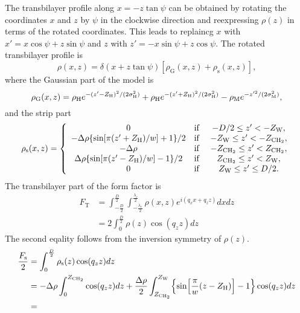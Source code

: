 \documentclass[12pt,letterpaper]{article}
\newcommand{\zw}{Z_\mathrm{W}}
\newcommand{\zchtwo}{Z_\mathrm{CH_2}}
\newcommand{\zh}{Z_\mathrm{H}}
\newcommand{\sigmah}{\sigma_\mathrm{H}}
\newcommand{\sigmam}{\sigma_\mathrm{M}}
\newcommand{\rhoh}{\rho_\mathrm{H}}
\newcommand{\rhom}{\rho_\mathrm{M}}
\newcommand{\rhog}{\rho_\mathrm{G}}
\newcommand{\rhos}{\rho_\mathrm{s}}
\begin{document}
The transbilayer profile along $x=-z\tan\psi$ can be obtained by rotating
the coordinates $x$ and $z$ by $\psi$ in the clockwise direction and
reexpressing $\rho(z)$ in terms of the rotated coordinates. This leads
to replaincg $x$ with $x'=x\cos\psi+z\sin\psi$ and
$z$ with $z'=-x\sin\psi+z\cos\psi$. The rotated transbilayer profile is
\begin{equation}
  \rho(x,z) = \delta(x+z\tan\psi)\left[\rhog(x,z) + \rhos(x,z)\right],
\end{equation}
where the Gaussian part of the model is 
\begin{equation}
  \rhog(x,z) = \rhoh e^{-(z'-\zh)^2/(2\sigmah^2)} \\
  + \rhoh e^{-(z'+\zh)^2/(2\sigmah^2)}
  - \rhom e^{-z'^2/(2\sigmam^2)},
\end{equation}
and the strip part
\begin{equation}
  \rhos(x,z) =  \left\{
    \begin{array}{ccc}
      0 & \text{if } & -D/2 \leq z' < -\zw,\\
      -\Delta\rho\braces{\sin\bracks{\pi(z'+\zh)/w}+1}/2 
        & \text{if } & -\zw \leq z' < -\zchtwo,\\
      -\Delta\rho & \text{if } & -\zchtwo \leq z' < \zchtwo,\\
      \Delta\rho\braces{\sin\bracks{\pi(z'-\zh)/w}-1}/2 
        & \text{if } & \zchtwo \leq z' < \zw,\\
      0 & \text{if } & \zw \leq z' \leq D/2.
    \end{array}
  \right.
\end{equation}
The transbilayer part of the form factor is
\begin{align}
  F_\mathrm{T} 
  &= \int_{-\frac{D}{2}}^{\frac{D}{2}} \int_{-\frac{\lambda_r}{2}}^{\frac{\lambda_r}{2}} 
     \rho(x,z) e^{i(q_xx+q_zz)} dxdz \nonumber\\
  &= 2 \int_0^{\frac{D}{2}} \rho(z) \cos (q_zz) dz
\end{align}
The second eqality follows from the inversion symmetry of $\rho(z)$. 
\begin{align}
  \frac{F_\mathrm{s}}{2} 
  &= \int_0^{\frac{D}{2}} \rho_\mathrm{s}(z) \cos (q_zz) dz \nonumber\\
  &= -\Delta\rho \int_0^{\zchtwo} \cos(q_zz) dz 
     + \frac{\Delta\rho}{2} \int_{\zchtwo}^{\zw} 
       \braces{\sin\bracks{\frac{\pi}{w}(z-\zh)}-1} \cos(q_zz) dz \nonumber\\
  &=
\end{align}
\end{document}
